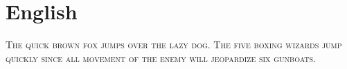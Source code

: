 

\presection\section*{\checkyes English}\postsection

\textsc{The quick brown fox jumps over the lazy dog.
The five boxing wizards jump quickly since all movement 
of the enemy will jeopardize six gunboats.}